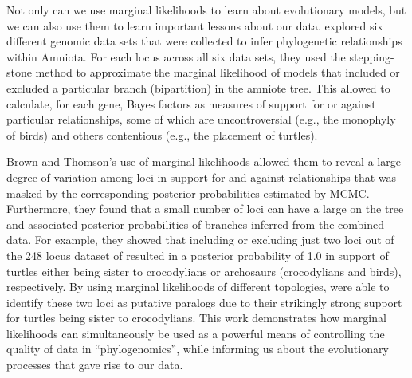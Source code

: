 Not only can we use marginal likelihoods to learn about evolutionary models,
but we can also use them to learn important lessons about our data.
\citet{Brown2017} explored six different genomic data sets
that were collected to infer phylogenetic relationships within Amniota.
For each locus across all six data sets, they used the stepping-stone method
\citep{Xie2011} to approximate the marginal likelihood of models that included
or excluded a particular branch (bipartition) in the amniote tree.
This allowed \citet{Brown2017} to calculate, for each
gene, Bayes factors as measures of support for or against particular
relationships, some of which are uncontroversial (e.g., the monophyly of birds)
and others contentious (e.g., the placement of turtles).


Brown and Thomson's \citeyear{Brown2017} use of marginal likelihoods allowed
them to reveal a large degree of variation among loci in
support for and against relationships that was masked by the corresponding
posterior probabilities estimated by MCMC.
Furthermore, they found that a small number of loci can have a large  on
the tree and associated posterior probabilities of branches inferred from the
combined data.
For example, they showed that including or excluding just two loci out of the
248 locus dataset of \citep{Chiari2012} resulted in a posterior probability of
1.0 in support of turtles either being sister to crocodylians or archosaurs
(crocodylians and birds), respectively.
By using marginal likelihoods of different topologies,
\citet{Brown2017} were able to identify these two loci as putative paralogs
due to their strikingly strong support for turtles being sister to
crocodylians.
This work demonstrates how marginal likelihoods can simultaneously be used as a
powerful means of controlling the quality of data in ``phylogenomics'', while
informing us about the evolutionary processes that gave rise to our data.

